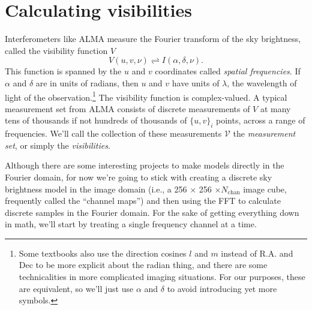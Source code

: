 \documentclass[modern]{aastex62}
\newcommand{\vd}{\boldsymbol{\mathcal{V}}} %
\begin{document}
\section{Calculating visibilities}
Interferometers like ALMA measure the Fourier transform of the sky brightness, called the visibility function $V$
\begin{equation}
  V(u, v, \nu) \rightleftharpoons I(\alpha, \delta, \nu).
\end{equation}
This function is spanned by the $u$ and $v$ coordinates called \emph{spatial frequencies}. If $\alpha$ and $\delta$ are in units of radians, then $u$ and $v$ have units of $\lambda$, the wavelength of light of the observation.\footnote{Some textbooks also use the direction cosines $l$ and $m$ instead of R.A. and Dec to be more explicit about the radian thing, and there are some technicalities in more complicated imaging situations. For our purposes, these are equivalent, so we'll just use $\alpha$ and $\delta$ to avoid introducing yet more symbols.} The visibility function is complex-valued. A typical measurement set from ALMA consists of discrete measurements of $V$ at many tens of thousands if not hundreds of thousands of $\{ u, v\}_i$ points, across a range of frequencies. We'll call the collection of these measurements $\vd$ the \emph{measurement set}, or simply the \emph{visibilities}.

Although there are some interesting projects to make models directly in the Fourier domain, for now we're going to stick with creating a discrete sky brightness model in the image domain (i.e., a 256 $\times$ 256 $\times N_\mathrm{chan}$ image cube, frequently called the ``channel maps'') and then using the FFT to calculate discrete samples in the Fourier domain. For the sake of getting everything down in math, we'll start by treating a single frequency channel at a time. 
\end{document}
